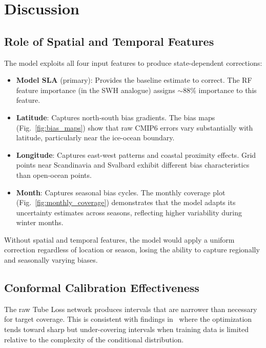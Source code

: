 \documentclass[conference]{IEEEtran}
\begin{document}
\section{Discussion}

\subsection{Role of Spatial and Temporal Features}

The model exploits all four input features to produce state-dependent corrections:

\begin{itemize}
    \item \textbf{Model SLA} (primary): Provides the baseline estimate to correct. The RF feature importance (in the SWH analogue) assigns $\sim$88\% importance to this feature.
    \item \textbf{Latitude}: Captures north-south bias gradients. The bias maps (Fig.~\ref{fig:bias_maps}) show that raw CMIP6 errors vary substantially with latitude, particularly near the ice-ocean boundary.
    \item \textbf{Longitude}: Captures east-west patterns and coastal proximity effects. Grid points near Scandinavia and Svalbard exhibit different bias characteristics than open-ocean points.
    \item \textbf{Month}: Captures seasonal bias cycles. The monthly coverage plot (Fig.~\ref{fig:monthly_coverage}) demonstrates that the model adapts its uncertainty estimates across seasons, reflecting higher variability during winter months.
\end{itemize}

Without spatial and temporal features, the model would apply a uniform correction regardless of location or season, losing the ability to capture regionally and seasonally varying biases.

\subsection{Conformal Calibration Effectiveness}

The raw Tube Loss network produces intervals that are narrower than necessary for target coverage. This is consistent with findings in~\cite{anand2024} where the optimization tends toward sharp but under-covering intervals when training data is limited relative to the complexity of the conditional distribution.
\end{document}

